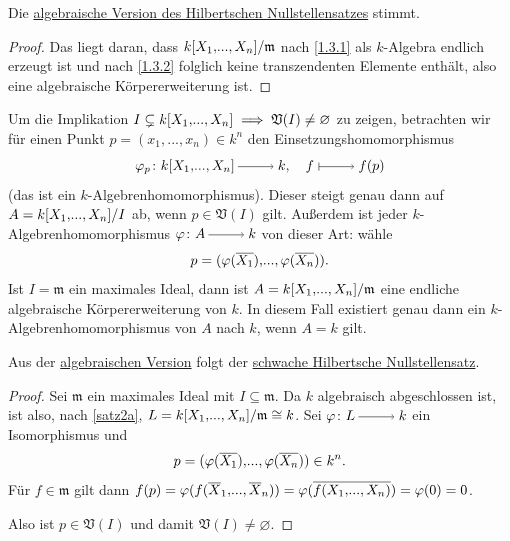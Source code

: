 \documentclass[a4paper,12pt,index=toc]{scrbook}
\theoremstyle{keinenummern} %
\def\V{\mathfrak{V}}
\def\m{\mathfrak{m}}
\renewcommand{\phi}{\varphi}
\newcommand{\leer}{\ensuremath{\varnothing}}
\renewcommand{\dotsc}{\ensuremath{\!...}}
\def\Bar#1{\ensuremath\overline{#1}}
\newcommand{\polyx}[1][n]{\ensuremath%
  [X_{1},\dotsc,X_{#1}]}
\begin{document}
\begin{prop}\label{1.3.3}
  Die \hyperref[s2a]{algebraische Version des Hilbertschen Nullstellensatzes} stimmt.
\end{prop}
\begin{proof}
  Das liegt daran, dass $\Quotient{k\polyx}{\m}$ nach \cref{1.3.1} als $k$-Algebra endlich erzeugt ist und nach \cref{1.3.2} folglich keine transzendenten Elemente enthält, also eine algebraische Körpererweiterung ist.
\end{proof}


Um die Implikation $I\subsetneq k\polyx \implies \V(I)\neq\leer$ zu zeigen, betrachten wir für einen Punkt $p=(x_1,\dotsc,x_n)\in
k^n$ den Einsetzungshomomorphismus \begin{equation*} \phi_p\colon k\polyx \ra k, \quad f\mapsto f(p) \end{equation*} (das ist ein
$k$-Algebrenhomomorphismus). Dieser steigt genau dann auf $A=\Quotient{k\polyx}{I}$ ab, wenn $p\in\V(I)$ gilt. Außerdem ist jeder
$k$-Algebrenhomomorphismus $\phi\colon A\ra k$ von dieser Art: wähle \begin{equation*}p=(\phi(\Bar{X_1}),\dotsc,\phi(\Bar{X_n})).\end{equation*} Ist $I=\m$ ein
maximales Ideal, dann ist $A=\Quotient{k\polyx}{\m}$ eine endliche algebraische Körpererweiterung von $k$. In diesem Fall
existiert genau dann ein $k$-Algebrenhomomorphismus von $A$ nach $k$, wenn $A=k$ gilt.

\begin{lem}\label{1.3.4}
  Aus der \hyperref[satz2a]{algebraischen Version} folgt der \hyperref[satz2b]{schwache Hilbertsche Nullstellensatz}.
\end{lem}
\begin{proof}
  Sei $\m$ ein maximales Ideal mit $I\subseteq\m$. Da $k$ algebraisch abgeschlossen ist, ist also, nach \cref{satz2a},
  $L=\Quotient{k\polyx}{\m}\cong k$. Sei $\phi\colon L\ra k$ ein Isomorphismus und \begin{equation*}p=(\phi(\Bar{X_1}),\dotsc,\phi(\Bar{X_n}))\in
  k^n.\end{equation*} Für $f\in\m$ gilt dann $f(p)=\phi(f(\Bar{X}_1,\dotsc,\Bar{X}_n))=\phi(\Bar{f(X_1,\dotsc,X_n)}) = \phi(0)=0$. 
  
Also ist $p\in\V(I)$ und damit $\V(I)\neq\leer$.
\end{proof}
\end{document}
